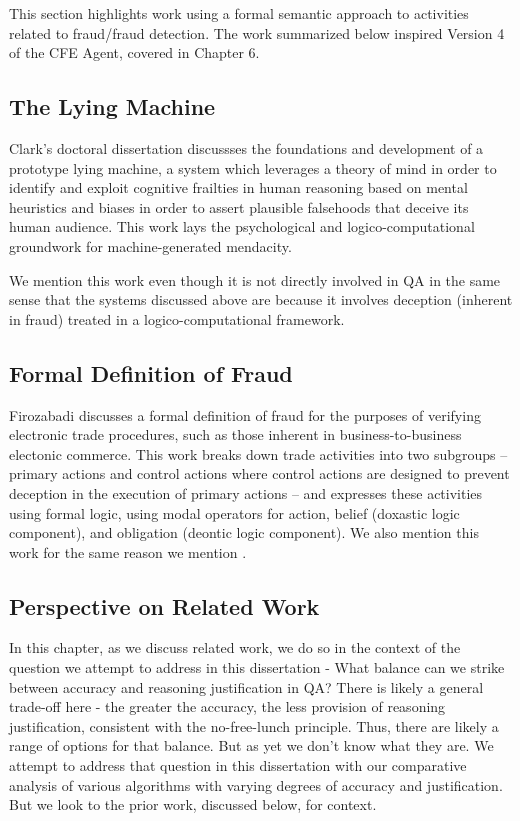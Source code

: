 This section highlights work using a formal semantic approach to activities related to fraud/fraud detection.  The work summarized below inspired Version 4 of the CFE Agent, covered in Chapter 6.

\subsection{The Lying Machine}

Clark's doctoral dissertation \cite{Clark:2010:CIL:2019791} discussses the foundations and development of a prototype lying machine, a system which leverages a theory of mind in order to identify and exploit cognitive frailties in human reasoning based on mental heuristics and biases in order to assert plausible falsehoods that deceive its human audience.  This work lays the psychological and logico-computational groundwork for machine-generated mendacity.

We mention this work even though it is not directly involved in QA in the same sense that the systems discussed above are because it involves deception (inherent in fraud) treated in a logico-computational framework.  

\subsection{Formal Definition of Fraud}

Firozabadi \cite{firozabadi1998formal} discusses a formal definition of fraud for the purposes of verifying electronic trade procedures, such as those inherent in business-to-business electonic commerce.  This work breaks down trade activities into two subgroups -- primary actions and control actions where control actions are designed to prevent deception in the execution of primary actions -- and expresses these activities using formal logic, using modal operators for action, belief (doxastic logic component), and obligation (deontic logic component).  We also mention this work for the same reason we mention \cite{Clark:2010:CIL:2019791}.  

\subsection{Perspective on Related Work}

In this chapter, as we discuss related work, we do so in the context of the question we attempt to address in this dissertation - What balance can we strike between accuracy and reasoning justification in QA?  There is likely a general trade-off here - the greater the accuracy, the less provision of reasoning justification, consistent with the no-free-lunch principle.  Thus, there are likely a range of options for that balance.  But as yet we don't know what they are.  We attempt to address that question in this dissertation with our comparative analysis of various algorithms with varying degrees of accuracy and justification.  But we look to the prior work, discussed below, for context.

